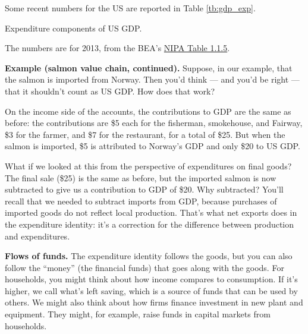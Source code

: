 Some recent numbers for the US are reported in Table \ref{tb:gdp_exp}.

\begin{table}[!ht]
\centering
\caption{Expenditure components of US GDP.}
\label{tb:gdp_exp}

\begin{minipage}{0.95\textwidth}
\footnotesize{%
\smallskip
The numbers are for 2013,
from the BEA's
\href{http://www.bea.gov/iTable/iTableHtml.cfm?reqid=9&step=3&isuri=1&903=5}{NIPA Table 1.1.5}.
}
\end{minipage}
\end{table}

\textbf{Example (salmon value chain, continued).}
Suppose, in our example, that the salmon is imported from Norway.
Then you'd think --- and you'd be right --- that it shouldn't
count as US GDP.
How does that work?

On the income side of the accounts, the
contributions to GDP are the same as before:
the contributions are \$5 each for the fisherman,
smokehouse, and Fairway, \$3 for the farmer, and
\$7 for the restaurant, for a total of \$25.
But when the salmon is imported,
\$5 is attributed to Norway's GDP and only \$20 to US GDP.

What if we looked at this from the perspective of expenditures on final goods?
The final sale (\$25) is the same as before, but the imported
salmon is now subtracted to give us a contribution to GDP of \$20.
Why subtracted?  You'll recall that we needed to subtract imports
from GDP, because purchases of imported goods do not reflect
local production.
That's what net exports does in the expenditure identity:
it's a correction for the difference between
production and expenditures.


\textbf{Flows of funds. }
The expenditure identity follows the goods, but you can also follow
the ``money'' (the financial funds) that goes along with the goods.
For households, you might think about how income compares to consumption.
If it's higher, we call what's left saving, which is a source of funds
that can be used by others.
We might also think about how firms finance investment in new plant and equipment.
They might, for example, raise funds in capital markets from households.


